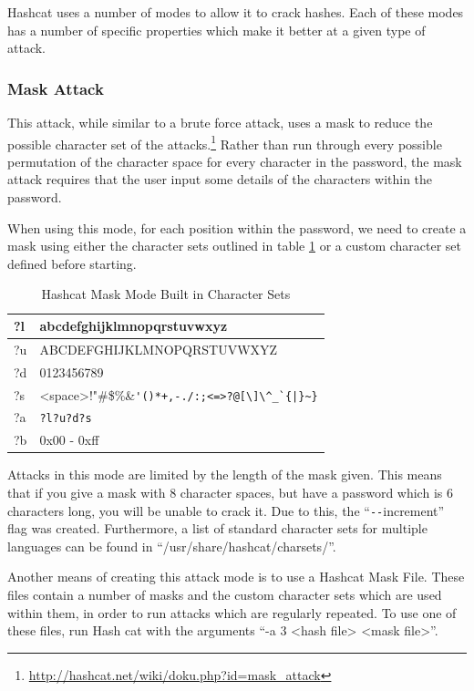 \documentclass[a4paper,11pt]{report}
\begin{document}
			Hashcat uses a number of modes to allow it to crack hashes. 
			Each of these modes has a number of specific properties which make it better at a given type of attack. 

			\subsubsection{Mask Attack}
				This attack, while similar to a brute force attack, uses a mask to reduce the possible character set of the attacks.\footnote{\url{http://hashcat.net/wiki/doku.php?id=mask_attack}} 
				Rather than run through every possible permutation of the character space for every character in the password, the mask attack requires that the user input some details of the characters within the password. 
				
				When using this mode, for each position within the password, we need to create a mask using either the character sets outlined in table \ref{tab:HashcatMaskCharSets} or a custom character set defined before starting. 
				\begin{table}[htb]
					\centering
					\begin{tabular}{| l | l |}
						\hline
						?l & abcdefghijklmnopqrstuvwxyz \\ \hline
						?u & ABCDEFGHIJKLMNOPQRSTUVWXYZ \\ \hline
						?d & 0123456789 \\ \hline
						?s & <space>!"\#\$\%\&\verb!'()*+,-./:;<=>?@[\]\^_`{|}~}! \\ \hline
						?a & \verb+?l?u?d?s+ \\ \hline
						?b & 0x00 - 0xff \\ \hline
					\end{tabular}
					\caption{Hashcat Mask Mode Built in Character Sets}
					\label{tab:HashcatMaskCharSets}
				\end{table}
				Attacks in this mode are limited by the length of the mask given. 
				This means that if you give a mask with 8 character spaces, but have a password which is 6 characters long, you will be unable to crack it. 
				Due to this, the ``\verb+--+increment'' flag was created. 
				Furthermore, a list of standard character sets for multiple languages can be found in ``/usr/share/hashcat/charsets/''.

				Another means of creating this attack mode is to use a Hashcat Mask File. 
				These files contain a number of masks and the custom character sets which are used within them, in order to run attacks which are regularly repeated. 
				To use one of these files, run Hash cat with the arguments ``-a 3 <hash file> <mask file>''.
\end{document}
